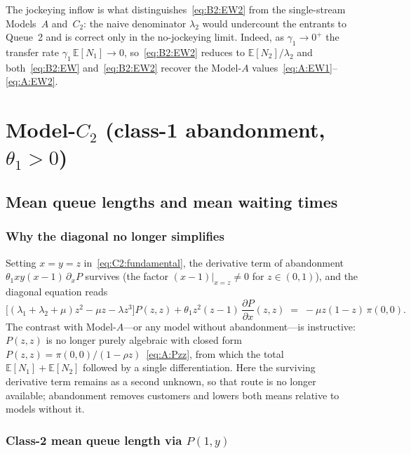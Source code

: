 \documentclass{article}
\numberwithin{equation}{section}
\begin{document}
The jockeying inflow is what distinguishes~\eqref{eq:B2:EW2} from the single-stream
Models~$A$ and~$C_2$: the naive denominator $\lambda_2$ would undercount the entrants to
Queue~2 and is correct only in the no-jockeying limit. Indeed, as $\gamma_1\to0^{+}$ the
transfer rate $\gamma_1\,\mathbb{E}[N_1]\to0$, so~\eqref{eq:B2:EW2} reduces to
$\mathbb{E}[N_2]/\lambda_2$ and both~\eqref{eq:B2:EW} and~\eqref{eq:B2:EW2} recover the
Model-$A$ values~\eqref{eq:A:EW1}--\eqref{eq:A:EW2}.

\section{Model-$C_2$ (class-1 abandonment, $\theta_1>0$)}

\subsection{Mean queue lengths and mean waiting times}

\subsubsection*{Why the diagonal no longer simplifies}

Setting $x=y=z$ in~\eqref{eq:C2:fundamental}, the derivative term of abandonment $\theta_1 xy(x-1)\,\partial_xP$ survives (the factor $(x-1)|_{x=z}\neq0$ for $z\in(0,1)$), and the diagonal equation reads
\begin{equation}
    \bigl[(\lambda_1{+}\lambda_2{+}\mu)z^2-\mu z-\lambda z^3\bigr]P(z,z)
    + \theta_1 z^2(z-1)\,\frac{\partial P}{\partial x}(z,z)
    \;=\; -\mu z(1-z)\,\pi(0,0).
    \label{eq:C2:diag}
\end{equation}
The contrast with Model-$A$---or any model without abandonment---is instructive: $P(z,z)$ is no longer purely algebraic with closed form $P(z,z)=\pi(0,0)/(1-\rho z)$~\eqref{eq:A:Pzz}, from which the total $\mathbb{E}[N_1]+\mathbb{E}[N_2]$ followed by a single differentiation. Here the surviving derivative term remains as a second unknown, so that route is no longer available; abandonment removes customers and lowers both means relative to models without it.

\subsubsection*{Class-2 mean queue length via \texorpdfstring{$P(1,y)$}{P(1,y)}}
\end{document}
